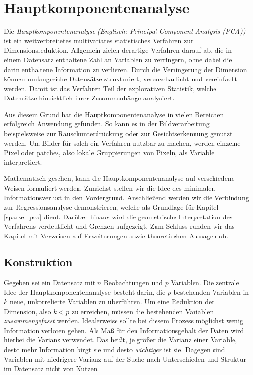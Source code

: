 \chapter{Hauptkomponentenanalyse}

\label{pca}

Die \textit{Hauptkomponentenanalyse (Englisch: Principal Component Analysis (PCA))} ist ein weitverbreitetes multivariates statistisches Verfahren zur Dimensionsreduktion. Allgemein zielen derartige Verfahren darauf ab, die in einem Datensatz enthaltene Zahl an Variablen zu verringern, ohne dabei die darin enthaltene Information zu verlieren. Durch die Verringerung der Dimension können umfangreiche Datensätze strukturiert, veranschaulicht und vereinfacht werden. Damit ist das Verfahren Teil der explorativen Statistik, welche Datensätze hinsichtlich ihrer Zusammenhänge analysiert.

Aus diesem Grund hat die Hauptkomponentenanalyse in vielen Bereichen erfolgreich Anwendung gefunden. So kann es in der Bildverarbeitung beispielsweise zur Rauschunterdrückung \cite{babu} oder zur Gesichtserkennung \cite{jiang} genutzt werden. Um Bilder für solch ein Verfahren nutzbar zu machen, werden einzelne Pixel oder patches, also lokale Gruppierungen von Pixeln, als Variable interpretiert. 

Mathematisch gesehen, kann die Hauptkomponentenanalyse auf verschiedene Weisen formuliert werden. Zunächst stellen wir die Idee des minimalen Informationsverlust in den Vordergrund. Anschließend werden wir die Verbindung zur Regressionsanalyse demonstrieren, welche als Grundlage für Kapitel \ref{sparse_pca} dient. Darüber hinaus wird die geometrische Interpretation des Verfahrens verdeutlicht und Grenzen aufgezeigt. Zum Schluss runden wir das Kapitel mit Verweisen auf Erweiterungen sowie theoretischen Aussagen ab.




\section{Konstruktion}

Gegeben sei ein Datensatz mit $n$ Beobachtungen und $p$ Variablen. Die zentrale Idee der Hauptkomponentenanalyse besteht darin, die $p$ bestehenden Variablen in $k$ neue, unkorrelierte Variablen zu überführen. Um eine Reduktion der Dimension, also $k < p$ zu erreichen, müssen die bestehenden Variablen \textit{zusammengefasst} werden. Idealerweise sollte bei diesem Prozess möglichst wenig Information verloren gehen. Als Maß für den Informationsgehalt der Daten wird hierbei die Varianz verwendet. Das heißt, je größer die Varianz einer Variable, desto mehr Information birgt sie und desto \textit{wichtiger} ist sie. Dagegen sind Variablen mit niedrigere Varianz auf der Suche nach Unterschieden und Struktur im Datensatz nicht von Nutzen. 

